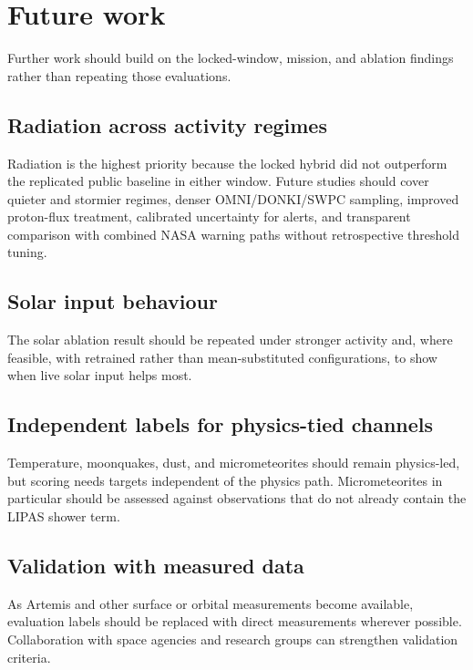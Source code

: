 \section{Future work}
\label{sec:future}

Further work should build on the locked-window, mission, and ablation findings rather than repeating those evaluations.

\subsection{Radiation across activity regimes}

Radiation is the highest priority because the locked hybrid did not outperform the replicated public baseline in either window. Future studies should cover quieter and stormier regimes, denser OMNI/DONKI/SWPC sampling, improved proton-flux treatment, calibrated uncertainty for alerts, and transparent comparison with combined NASA warning paths without retrospective threshold tuning.

\subsection{Solar input behaviour}

The solar ablation result should be repeated under stronger activity and, where feasible, with retrained rather than mean-substituted configurations, to show when live solar input helps most.

\subsection{Independent labels for physics-tied channels}

Temperature, moonquakes, dust, and micrometeorites should remain physics-led, but scoring needs targets independent of the physics path. Micrometeorites in particular should be assessed against observations that do not already contain the LIPAS shower term.

\subsection{Validation with measured data}

As Artemis and other surface or orbital measurements become available, evaluation labels should be replaced with direct measurements wherever possible. Collaboration with space agencies and research groups can strengthen validation criteria.

